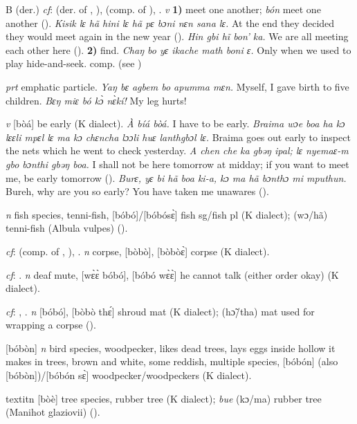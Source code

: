 \begin{letter}{B}
 (der.) \textit{cf}:  (der. of , ),  (comp. of ), . \textit{v} \textbf{1)} meet one another; \textit{bón} meet one another (\citealt{Sumner1921}). \textit{Kisik lɛ hã hini lɛ hã pɛ bɔni nɛn sana lɛ.} At the end they decided they would meet again in the new year (\citealt{Pichl1967}). \textit{Hin gbi hĩ bon' ka.} We are all meeting each other here (\citealt{Pichl1967}). \textbf{2)} find. \textit{Chaŋ bo yɛ ikache math boni ɛ.} Only when we used to play hide-and-seek. comp.  (see ) 

 \textit{prt} emphatic particle. \textit{Yaŋ bɛ agbem bo apumma mɛn.} Myself, I gave birth to five children. \textit{Bɛŋ miɛ bó kɔ̀ nɛ̀kí!} My leg hurts! 

 \textit{v} [bòá] be early (K dialect). \textit{À bíá bòá.} I have to be early. \textit{Braima wɔe boa ha kɔ lɛɛli mpɛl lɛ ma kɔ chɛncha lɔɔli huɛ lanthgbɔl lɛ.} Braima goes out early to inspect the nets which he went to check yesterday. \textit{A chen che ka gbəŋ ipal; lɛ nyemaɛ-m gbo bɔnthi gbəŋ boa.} I shall not be here tomorrow at midday; if you want to meet me, be early tomorrow (\citealt{Pichl1967}). \textit{Burɛ, yɛ bi hã boa ki-a, kɔ ma hã bɔnthɔ mi mputhun.} Bureh, why are you so early? You have taken me unawares (\citealt{Pichl1967}). 

 \textit{n} fish species, tenni-fish, [bóbó]/[bóbósɛ̀] fish sg/fish pl (K dialect); (wɔ/hã) tenni-fish (Albula vulpes) (\citealt{Pichl1967}). 

 \textit{cf}:  (comp. of , ), . \textit{n} corpse, [bòbò], [bòbòɛ̀] corpse (K dialect). 

 \textit{cf}: . \textit{n} deaf mute, [wɛ̀ɛ̀ bóbó], [bóbó wɛ̀ɛ̀] he cannot talk (either order okay) (K dialect).

 \textit{cf}: , . \textit{n} [bóbó], [bòbò thɛ́] shroud mat (K dialect); (hɔ̃/tha) mat used for wrapping a corpse (\citealt{Pichl1967}). 

 [bóbòn] \textit{n} bird species, woodpecker, likes dead trees, lays eggs inside hollow it makes in trees, brown and white, some reddish, multiple species, [bóbón] (also [bóbòn])/[bóbón sɛ̀] woodpecker/woodpeckers (K dialect).

 textit{n} [bòè] tree species, rubber tree (K dialect); \textit{bue} (kɔ/ma) rubber tree (Manihot glaziovii) (\citealt{Pichl1967}).


\end{letter}
